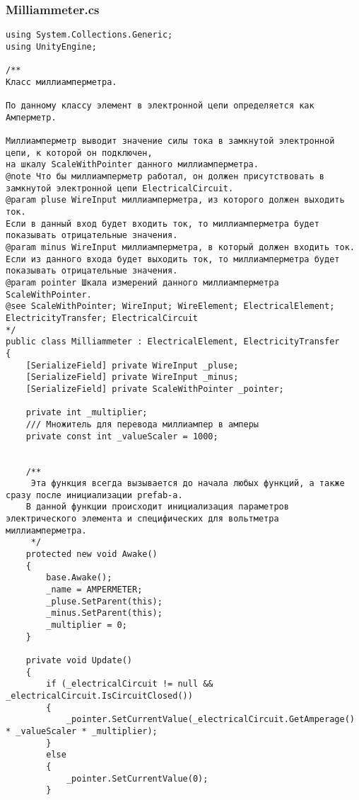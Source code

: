 \subsubsection*{Milliammeter.cs}
\begin{verbatim}
﻿using System.Collections.Generic;
using UnityEngine;

/**
Класс миллиамперметра.

По данному классу элемент в электронной цепи определяется как Амперметр.

Миллиамперметр выводит значение силы тока в замкнутой электронной цепи, к которой он подключен, 
на шкалу ScaleWithPointer данного миллиамперметра.
@note Что бы миллиамперметр работал, он должен присутствовать в замкнутой электронной цепи ElectricalCircuit.
@param pluse WireInput миллиамперметра, из которого должен выходить ток.
Если в данный вход будет входить ток, то миллиамперметра будет показывать отрицательные значения.
@param minus WireInput миллиамперметра, в который должен входить ток.
Если из данного входа будет выходить ток, то миллиамперметра будет показывать отрицательные значения.
@param pointer Шкала измерений данного миллиамперметра ScaleWithPointer.
@see ScaleWithPointer; WireInput; WireElement; ElectricalElement; ElectricityTransfer; ElectricalCircuit
*/
public class Milliammeter : ElectricalElement, ElectricityTransfer
{
    [SerializeField] private WireInput _pluse;
    [SerializeField] private WireInput _minus;
    [SerializeField] private ScaleWithPointer _pointer;

    private int _multiplier;
    /// Множитель для перевода миллиампер в амперы
    private const int _valueScaler = 1000;


    /**
     Эта функция всегда вызывается до начала любых функций, а также сразу после инициализации prefab-а.
    В данной функции происходит инициализация параметров электрического элемента и специфических для вольтметра миллиамперметра.
     */
    protected new void Awake()
    {
        base.Awake();
        _name = AMPERMETER;
        _pluse.SetParent(this);
        _minus.SetParent(this);
        _multiplier = 0;
    }

    private void Update()
    {
        if (_electricalCircuit != null && _electricalCircuit.IsCircuitClosed())
        {
            _pointer.SetCurrentValue(_electricalCircuit.GetAmperage() * _valueScaler * _multiplier);
        }
        else
        {
            _pointer.SetCurrentValue(0);
        }


\end{verbatim}
